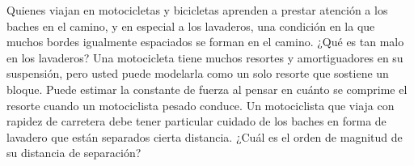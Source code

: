 \item Quienes viajan en motocicletas y bicicletas aprenden a prestar atención a los baches en el camino, y en especial a los lavaderos, una condición en la que muchos bordes igualmente espaciados se forman en el camino. ¿Qué es tan malo en los lavaderos? Una motocicleta tiene muchos resortes y amortiguadores en su suspensión, pero usted puede modelarla como un solo resorte que sostiene un bloque. Puede estimar la constante de fuerza al pensar en cuánto se comprime el resorte cuando un motociclista pesado conduce. Un motociclista que viaja con rapidez de carretera debe tener particular cuidado de los baches en forma de lavadero que están separados cierta distancia. ¿Cuál es el orden de magnitud de su distancia de separación?